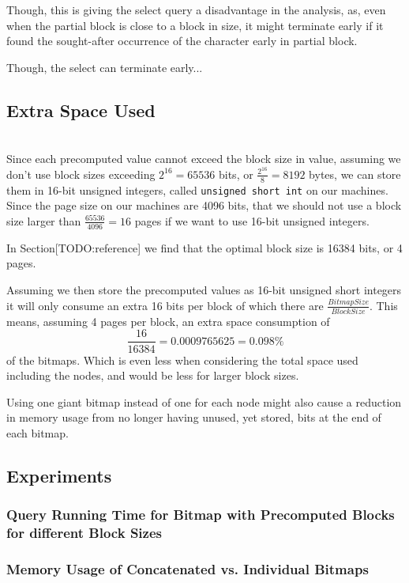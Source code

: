 Though, this is giving the select query a disadvantage in the analysis, as, even when the partial block is close to a block in size, it might terminate early if it found the sought-after occurrence of the character early in partial block.

Though, the select can terminate early...



\subsection{Extra Space Used}~\\


Since each precomputed value cannot exceed the block size in value, assuming we don't use block sizes exceeding $2^{16} = 65536$ bits, or $\frac{2^{16}}{8} = 8192$ bytes, we can store them in 16-bit unsigned integers, called \texttt{unsigned short int} on our machines. Since the page size on our machines are 4096 bits, that we should not use a block size larger than $\frac{65536}{4096} = 16$ pages if we want to use 16-bit unsigned integers.

In Section[TODO:reference] we find that the optimal block size is 16384 bits, or 4 pages.

Assuming we then store the precomputed values as 16-bit unsigned short integers it will only consume an extra 16 bits per block of which there are $\frac{BitmapSize}{BlockSize}$.
This means, assuming 4 pages per block, an extra space consumption of
\[ \frac{16}{16384} = 0.0009765625 = 0.098\% \]
of the bitmaps.
Which is even less when considering the total space used including the nodes, and would be less for larger block sizes.

Using one giant bitmap instead of one for each node might also cause a reduction in memory usage from no longer having unused, yet stored, bits at the end of each bitmap.


\subsection{Experiments}
\subsubsection{Query Running Time for Bitmap with Precomputed Blocks for different Block Sizes}

\subsubsection{Memory Usage of Concatenated vs. Individual Bitmaps}